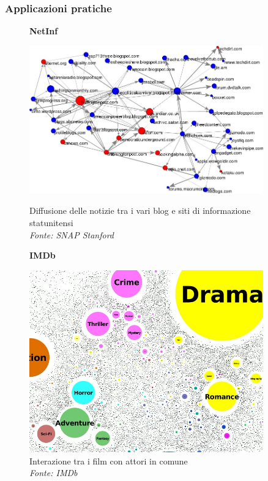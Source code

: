 \begin{frame}
	\frametitle{Applicazioni pratiche}
	
	\pause
	\centering
	\begin{figure}[h]
		\centering
		\begin{minipage}[t]{.49\textwidth}
			\centering
			\textbf{NetInf}\medskip
			
			\includegraphics[width=0.9\textwidth]{images/4_netinf}
			\caption{Diffusione delle notizie tra i vari blog e siti di informazione statunitensi\\ \textit{Fonte: SNAP Stanford}}
		\end{minipage}\hfill
		\pause
		\begin{minipage}[t]{.49\textwidth}
			\centering
			\textbf{IMDb}\medskip
			
			\includegraphics[width=0.9\textwidth]{images/6_imdb}
			\caption{Interazione tra i film con attori in comune\\ \textit{Fonte: IMDb}}
		\end{minipage}
	\end{figure}
\end{frame}
